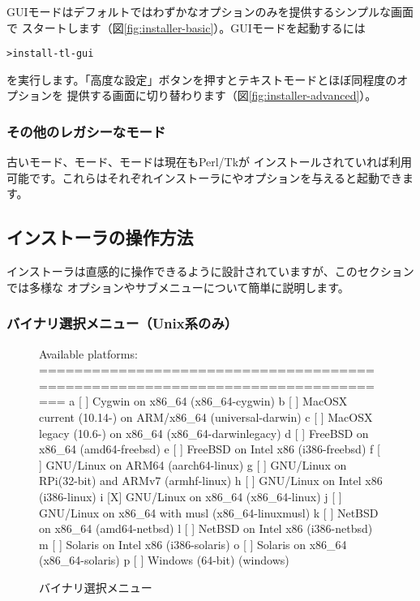\documentclass[uplatex,dvipdfmx,12pt]{jsarticle}
\begin{document}
GUIモードはデフォルトではわずかなオプションのみを提供するシンプルな画面で
スタートします（図\ref{fig:installer-basic}）。GUIモードを起動するには
%
\begin{alltt}
> install-tl -gui
\end{alltt}
%
を実行します。「高度な設定」ボタンを押すとテキストモードとほぼ同程度のオプションを
提供する画面に切り替わります（図\ref{fig:installer-advanced}）。

\subsubsection{その他のレガシーなモード}

古いモード、モード、モードは現在もPerl/Tkが
インストールされていれば利用可能です。これらはそれぞれインストーラにやオプションを与えると起動できます。

\subsection{インストーラの操作方法}
\label{sec:runinstall}

インストーラは直感的に操作できるように設計されていますが、このセクションでは多様な
オプションやサブメニューについて簡単に説明します。

\subsubsection{バイナリ選択メニュー（Unix系のみ）}
\label{sec:binary}

\begin{figure}[tb]
\begin{boxedverbatim}
Available platforms:
===============================================================================
   a [ ] Cygwin on x86_64 (x86_64-cygwin)
   b [ ] MacOSX current (10.14-) on ARM/x86_64 (universal-darwin)
   c [ ] MacOSX legacy (10.6-) on x86_64 (x86_64-darwinlegacy)
   d [ ] FreeBSD on x86_64 (amd64-freebsd)
   e [ ] FreeBSD on Intel x86 (i386-freebsd)
   f [ ] GNU/Linux on ARM64 (aarch64-linux)
   g [ ] GNU/Linux on RPi(32-bit) and ARMv7 (armhf-linux)
   h [ ] GNU/Linux on Intel x86 (i386-linux)
   i [X] GNU/Linux on x86_64 (x86_64-linux)
   j [ ] GNU/Linux on x86_64 with musl (x86_64-linuxmusl)
   k [ ] NetBSD on x86_64 (amd64-netbsd)
   l [ ] NetBSD on Intel x86 (i386-netbsd)
   m [ ] Solaris on Intel x86 (i386-solaris)
   o [ ] Solaris on x86_64 (x86_64-solaris)
   p [ ] Windows (64-bit) (windows)
\end{boxedverbatim}
\vspace{-1zh}
\caption{バイナリ選択メニュー}\label{fig:bin-text}
\end{figure}
\end{document}

